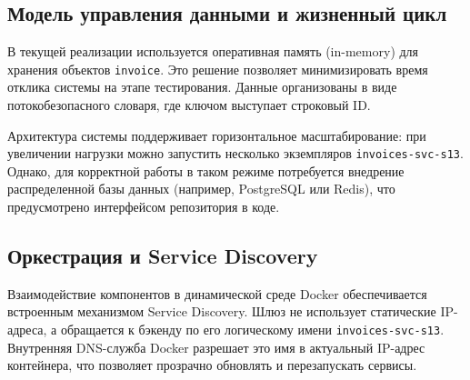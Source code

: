 \subsection{Модель управления данными и жизненный цикл}
В текущей реализации используется оперативная память (in-memory) для хранения объектов \texttt{invoice}. Это решение позволяет минимизировать время отклика системы на этапе тестирования. Данные организованы в виде потокобезопасного словаря, где ключом выступает строковый ID.

Архитектура системы поддерживает горизонтальное масштабирование: при увеличении нагрузки можно запустить несколько экземпляров \texttt{invoices-svc-s13}. Однако, для корректной работы в таком режиме потребуется внедрение распределенной базы данных (например, PostgreSQL или Redis), что предусмотрено интерфейсом репозитория в коде.

\subsection{Оркестрация и Service Discovery}
Взаимодействие компонентов в динамической среде Docker обеспечивается встроенным механизмом Service Discovery. Шлюз не использует статические IP-адреса, а обращается к бэкенду по его логическому имени \texttt{invoices-svc-s13}. Внутренняя DNS-служба Docker разрешает это имя в актуальный IP-адрес контейнера, что позволяет прозрачно обновлять и перезапускать сервисы.
